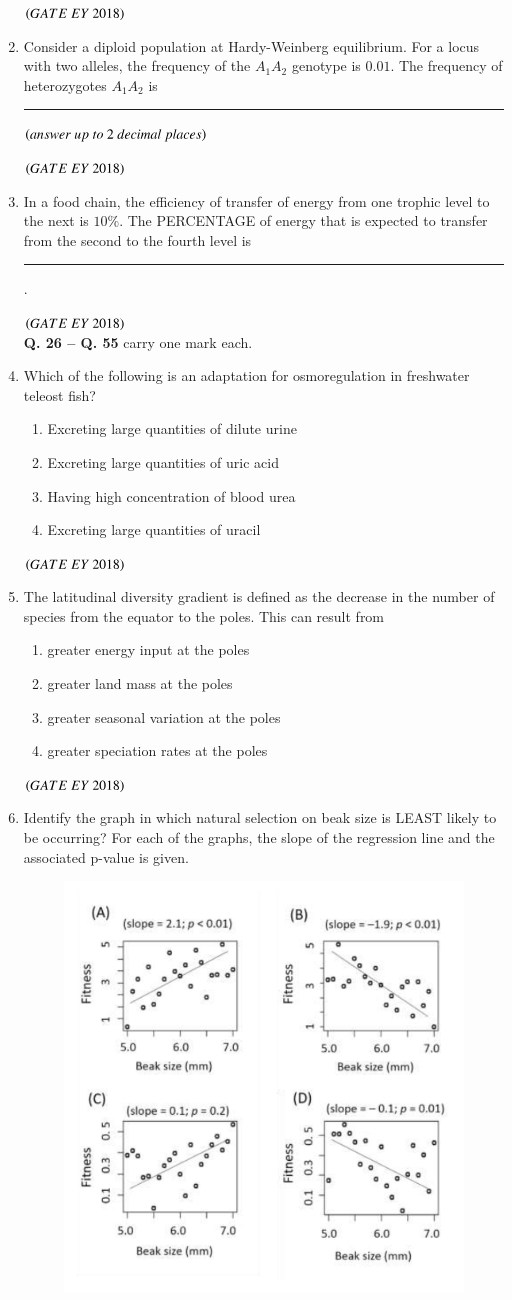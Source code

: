\documentclass[journal]{IEEEtran}
\numberwithin{equation}{enumi}
\numberwithin{figure}{enumi}
\begin{document}
\begin{enumerate}
    \hfill{$\brak{ GATE\ EY\ 2018}$}
    \bigskip
\item Consider a diploid population at Hardy-Weinberg equilibrium. For a locus with two
alleles, the frequency of the $A_1A_2$ genotype is $0.01$. The frequency of heterozygotes $A_1A_2$ is\rule{3cm}{0.15mm}
$\brak{answer\ up\ to\ 2\ decimal\ places}$
   
    \hfill{$\brak{ GATE\ EY\ 2018}$}
    \bigskip
\item In a food chain, the efficiency of transfer of energy from one trophic level to the
next is $10\%$. The PERCENTAGE of energy that is expected to transfer from the
second to the fourth level is\rule{3cm}{0.15mm}.

    \hfill{$\brak{ GATE\ EY\ 2018}$}
    \bigskip
\\
\noindent \textbf{Q. 26 -- Q. \textbf{55}} carry one mark each.
\\
\item Which of the following is an adaptation for osmoregulation in freshwater teleost
fish?
    \begin{enumerate}
        \item Excreting large quantities of dilute urine
        \item Excreting large quantities of uric acid
        \item Having high concentration of blood urea
        \item Excreting large quantities of uracil
    \end{enumerate}
    \hfill{$\brak{ GATE\ EY\ 2018}$}
    \bigskip
\item The latitudinal diversity gradient is defined as the decrease in the number of species
from the equator to the poles. This can result from
    \begin{enumerate}
        \item greater energy input at the poles
        \item greater land mass at the poles
        \item greater seasonal variation at the poles
        \item greater speciation rates at the poles 
    \end{enumerate}
    \hfill{$\brak{ GATE\ EY\ 2018}$}
    \bigskip
\item Identify the graph in which natural selection on beak size is LEAST likely to be
occurring? For each of the graphs, the slope of the regression line and the associated
p-value is given.\\
\begin{figure}[!ht]
\centering
\includegraphics[width=0.26\columnwidth]{figs/1.png}
\label{fig:1}
\end{figure}


\end{enumerate}
\end{document}

